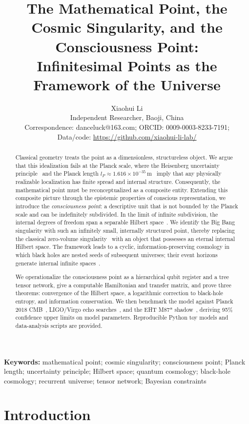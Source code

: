 \documentclass[11pt,a4paper]{article}
\title{\LARGE \bfseries The Mathematical Point, the Cosmic Singularity, and the Consciousness Point:\\[0.2em]
Infinitesimal Points as the Framework of the Universe}
\author{Xiaohui Li\\
\normalsize Independent Researcher, Baoji, China\\
\small Correspondence: danceluck@163.com; ORCID: 0009-0003-8233-7191;\\
\small Data/code: \url{https://github.com/xiaohui-li-lab/}}
\date{}
\theoremstyle{plain}
\begin{document}
\maketitle

\begin{abstract}
\noindent
Classical geometry treats the point as a dimensionless, structureless object. We argue that this idealization fails at the Planck scale, where the Heisenberg uncertainty principle~\cite{heisenberg1927} and the Planck length $l_P \approx 1.616\times10^{-35}\,\mathrm{m}$~\cite{planck1899} imply that any physically realizable localization has finite spread and internal structure. Consequently, the mathematical point must be reconceptualized as a composite entity. Extending this composite picture through the epistemic properties of conscious representation, we introduce the \emph{consciousness point}: a descriptive unit that is not bounded by the Planck scale and can be indefinitely subdivided. In the limit of infinite subdivision, the internal degrees of freedom span a separable Hilbert space~\cite{neumann1932,dirac1930}. We identify the Big Bang singularity with such an infinitely small, internally structured point, thereby replacing the classical zero-volume singularity~\cite{hawkingpenrose1966} with an object that possesses an eternal internal Hilbert space. The framework leads to a cyclic, information-preserving cosmology in which black holes are nested seeds of subsequent universes; their event horizons generate internal infinite spaces~\cite{bekenstein1973,hawking1974}.

We operationalize the consciousness point as a hierarchical qubit register and a tree tensor network, give a computable Hamiltonian and transfer matrix, and prove three theorems: convergence of the Hilbert space, a logarithmic correction to black-hole entropy, and information conservation. We then benchmark the model against Planck 2018 CMB~\cite{planck2018}, LIGO/Virgo echo searches~\cite{ligo2016,ligo2024tests}, and the EHT M87* shadow~\cite{eht2019,eht2019mass}, deriving 95\% confidence upper limits on model parameters. Reproducible Python toy models and data-analysis scripts are provided.
\end{abstract}

\noindent\textbf{Keywords:} mathematical point; cosmic singularity; consciousness point; Planck length; uncertainty principle; Hilbert space; quantum cosmology; black-hole cosmology; recurrent universe; tensor network; Bayesian constraints

\section{Introduction}
\end{document}
